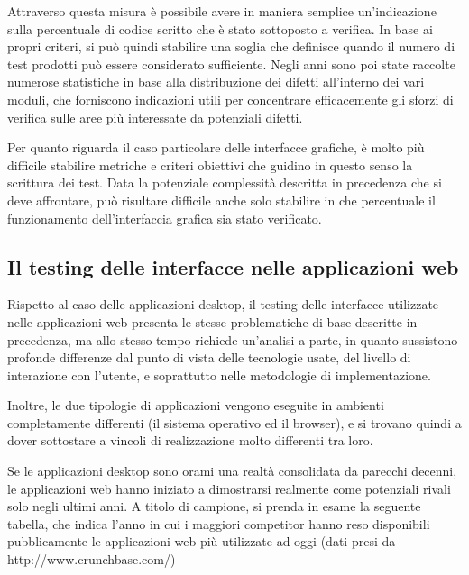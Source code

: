 Attraverso questa misura è possibile avere in maniera semplice un'indicazione sulla percentuale di codice scritto che è stato sottoposto a verifica. In base ai propri criteri, si può quindi stabilire una soglia che definisce quando il numero di test prodotti può essere considerato sufficiente. Negli anni sono poi state raccolte numerose statistiche in base alla distribuzione dei difetti all'interno dei vari moduli, che forniscono indicazioni utili per concentrare efficacemente gli sforzi di verifica sulle aree più interessate da potenziali difetti.

Per quanto riguarda il caso particolare delle interfacce grafiche, è molto più difficile stabilire metriche e criteri obiettivi che guidino in questo senso la scrittura dei test. Data la potenziale complessità descritta in precedenza che si deve affrontare, può risultare difficile anche solo stabilire in che percentuale il funzionamento dell'interfaccia grafica sia stato verificato.

\subsection{Il testing delle interfacce nelle applicazioni web}

Rispetto al caso delle applicazioni desktop, il testing delle interfacce utilizzate nelle applicazioni web presenta le stesse problematiche di base descritte in precedenza, ma allo stesso tempo richiede un'analisi a parte, in quanto sussistono profonde differenze dal punto di vista delle tecnologie usate, del livello di interazione con l'utente, e soprattutto nelle metodologie di implementazione.

Inoltre, le due tipologie di applicazioni vengono eseguite in ambienti completamente differenti (il sistema operativo ed il browser), e si trovano quindi a dover sottostare a vincoli di realizzazione molto differenti tra loro.

Se le applicazioni desktop sono orami una realtà consolidata da parecchi decenni, le applicazioni web hanno iniziato a dimostrarsi realmente come potenziali rivali solo negli ultimi anni. A titolo di campione, si prenda in esame la seguente tabella, che indica l'anno in cui i maggiori competitor hanno reso disponibili pubblicamente le applicazioni web più utilizzate ad oggi (dati presi da http://www.crunchbase.com/) %

